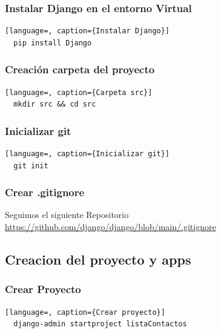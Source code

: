 \documentclass{article}
\begin{document}

  \subsubsection{Instalar Django en el entorno Virtual}
  \begin{lstlisting}[language=, caption={Instalar Django}]
  pip install Django
  \end{lstlisting}
  

  \subsubsection{Creación carpeta del proyecto}
  \begin{lstlisting}[language=, caption={Carpeta src}]
  mkdir src && cd src
  \end{lstlisting}
  

  \subsubsection{Inicializar git}
  \begin{lstlisting}[language=, caption={Inicializar git}]
  git init
  \end{lstlisting}
  

  \subsubsection{Crear .gitignore}
  Seguimos el siguiente Repositorio \url{https://github.com/django/django/blob/main/.gitignore}
  
  
  \subsection{Creacion del proyecto y apps}
  

  \subsubsection{Crear Proyecto}
  \begin{lstlisting}[language=, caption={Crear proyecto}]
  django-admin startproject listaContactos
  \end{lstlisting}
  
\end{document}
